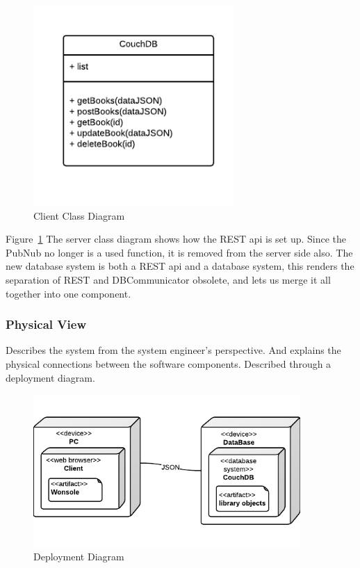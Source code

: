 \begin{figure}[h]
\centering
\includegraphics[width=3in]{image/architecture/s3/s3serverClassDiagram.png}
\caption{Client Class Diagram}
\label{figure:s3serverClassDiagram}
\end{figure}

Figure~\ref{figure:s3serverClassDiagram} The server class diagram shows how the REST api is set up. Since the PubNub no longer is a used function, it is removed from the server side also. The new database system is both a REST api and a database system, this renders the separation of REST and DBCommunicator obsolete, and lets us merge it all together into one component. 


\subsubsection{Physical View}
Describes the system from the system engineer's perspective. And explains the physical connections between the software components. Described through a deployment diagram. 

\begin{figure}[h]
\centering
\includegraphics[width=4in]{image/architecture/s3/s3DeploymentDiagram.png}
\caption{Deployment Diagram}
\label{figure:s3DeploymentDiagram}
\end{figure}

